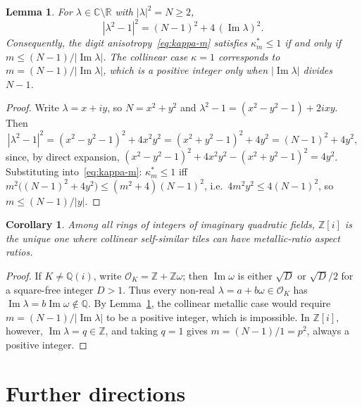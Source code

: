 \documentclass{amsart}
\newtheorem{corollary}[theorem]{Corollary}
\newtheorem{lemma}[theorem]{Lemma}
\theoremstyle{definition}
\theoremstyle{remark}
\begin{document}
\begin{lemma}\label{lem:quadratic}
For $\lambda\in\mathbb{C}\setminus\mathbb{R}$ with $|\lambda|^2=N\geq 2$,
\begin{equation}\label{eq:imag-identity}
  |\lambda^2-1|^2 = (N-1)^2 + 4\,(\operatorname{Im}\lambda)^2.
\end{equation}
Consequently, the digit anisotropy~\eqref{eq:kappa-m} satisfies
$\kappa_m^*\leq 1$ if and only if
$m\leq (N\!-\!1)/|\operatorname{Im}\lambda|$.
The collinear case $\kappa=1$ corresponds to
$m=(N\!-\!1)/|\operatorname{Im}\lambda|$, which is a positive integer
only when $|\operatorname{Im}\lambda|$ divides $N\!-\!1$.
\end{lemma}

\begin{proof}
Write $\lambda=x+iy$,  so $N=x^2+y^2$ and
$\lambda^2-1=(x^2\!-\!y^2\!-\!1)+2ixy$.  Then
\[
  |\lambda^2-1|^2
  = (x^2\!-\!y^2\!-\!1)^2 + 4x^2y^2
  = (x^2\!+\!y^2\!-\!1)^2 + 4y^2
  = (N\!-\!1)^2 + 4y^2,
\]
since, by direct expansion,
$(x^2\!-\!y^2\!-\!1)^2+4x^2y^2
  - (x^2\!+\!y^2\!-\!1)^2 = 4y^2$.
Substituting into~\eqref{eq:kappa-m}:
$\kappa_m^*\leq 1$
iff $m^2\bigl((N\!-\!1)^2+4y^2\bigr)\leq (m^2\!+\!4)(N\!-\!1)^2$,
i.e.\ $4m^2y^2\leq 4(N\!-\!1)^2$, so $m\leq (N\!-\!1)/|y|$.
\end{proof}

\begin{corollary}\label{cor:unique-Zi}
Among all rings of integers of imaginary quadratic fields, $\mathbb{Z}[i]$
is the unique one where collinear self-similar tiles can have
metallic-ratio aspect ratios.
\end{corollary}

\begin{proof}
If $K\neq\mathbb{Q}(i)$, write $\mathcal{O}_K=\mathbb{Z}+\mathbb{Z}\omega$;
then $\operatorname{Im}\omega$ is either $\sqrt{D}$ or $\sqrt{D}/2$
for a square-free integer $D>1$.  Thus every non-real
$\lambda=a+b\omega\in\mathcal{O}_K$ has
$\operatorname{Im}\lambda=b\operatorname{Im}\omega\notin\mathbb{Q}$.
By Lemma~\ref{lem:quadratic}, the collinear metallic case would require
$m=(N\!-\!1)/|\operatorname{Im}\lambda|$ to be a positive integer,
which is impossible.  In $\mathbb{Z}[i]$, however,
$\operatorname{Im}\lambda = q\in\mathbb{Z}$,
and taking $q=1$ gives $m=(N\!-\!1)/1 = p^2$, always a positive integer.
\end{proof}

\section{Further directions}
\end{document}
